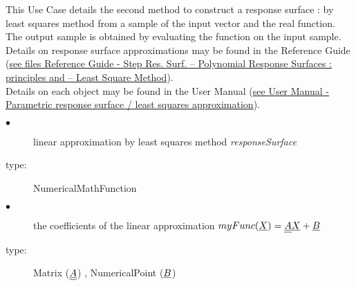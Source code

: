 \renewcommand{\filename}{docUC_RespSurface_LeastSquaresApprox.tex}
\renewcommand{\filetitle}{UC : Linear Least Squares approximation from a sample of the input vector and the real function}

\HeaderIIILevel



\label{leastSquareApprox}




This Use Case  details the second method to construct a response surface : by least squares method from a sample of the input vector and the real function. The output sample is obtained  by evaluating the function on the input sample.\\



Details on response surface approximations may be found in the Reference Guide (\href{OpenTURNS_ReferenceGuide.pdf}{see files Reference Guide - Step Res. Surf. -- Polynomial Response Surfaces : principles and -- Least Square Method}).\\

Details on each object may be found in the User Manual  (\href{OpenTURNS_UserManual_TUI.pdf}{see User Manual - Parametric response surface / least squares approximation}).\\


{
  \begin{description}
  \item[$\bullet$] linear approximation by least squares method {\itshape responseSurface}
  \item[type:] NumericalMathFunction
  \item[$\bullet$]  the coefficients of the linear approximation $myFunc({\underline{X}}) = {\underline{{\underline{A}}}}{\underline{X}} + {\underline{B}}$
  \item[type:] Matrix (${\underline{{\underline{A}}}}$) , NumericalPoint (${\underline{B}}$)
  \end{description}
}

